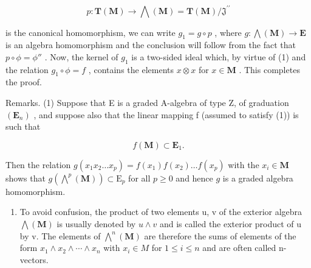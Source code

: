 \[
p \colon \mathbf {T} (\mathbf {M}) \rightarrow \bigwedge (\mathbf {M}) = \mathbf {T} (\mathbf {M}) / \mathfrak {J} ^ {\prime \prime}
\]

is the canonical homomorphism, we can write \(g_1 = g \circ p\) , where \(g: \bigwedge (\mathbf{M}) \to \mathbf{E}\) is an algebra homomorphism and the conclusion will follow from the fact that \(p \circ \phi = \phi''\) . Now, the kernel of \(g_1\) is a two-sided ideal which, by virtue of (1) and the relation \(g_1 \circ \phi = f\) , contains the elements \(x \otimes x\) for \(x \in \mathbf{M}\) . This completes the proof.

Remarks. (1) Suppose that E is a graded A-algebra of type Z, of graduation \((\mathbf{E}_{n})\) , and suppose also that the linear mapping f (assumed to satisfy (1)) is such that

\[
f (\mathbf {M}) \subset \mathbf {E} _ {1}.\tag{2}
\]

Then the relation \(g(x_1x_2 \ldots x_p) = f(x_1)f(x_2) \ldots f(x_p)\) with the \(x_i \in \mathbf{M}\) shows that \(g(\bigwedge^p (\mathbf{M})) \subset \mathrm{E}_p\) for all \(p \geqslant 0\) and hence \(g\) is a graded algebra homomorphism.

\begin{enumerate}
\def\labelenumi{(\arabic{enumi})}
\setcounter{enumi}{1}
\tightlist
\item
  To avoid confusion, the product of two elements u, v of the exterior algebra \(\bigwedge(\mathbf{M})\) is usually denoted by \(u \wedge v\) and is called the exterior product of u by v. The elements of \(\bigwedge^{n}(\mathbf{M})\) are therefore the sums of elements of the form \(x_{1} \wedge x_{2} \wedge \cdots \wedge x_{n}\) with \(x_{i} \in M\) for \(1 \leqslant i \leqslant n\) and are often called n-vectors.
\end{enumerate}

